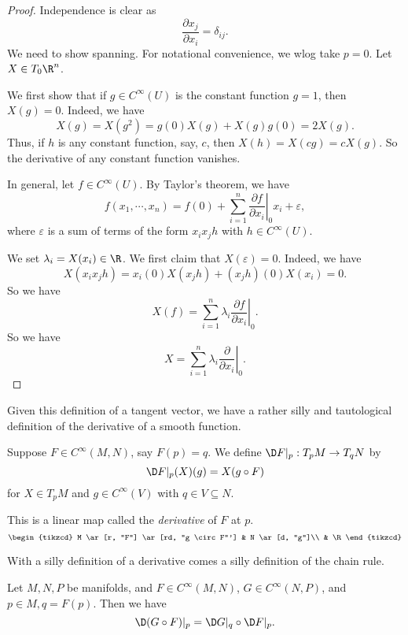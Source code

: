 \documentclass[a4paper]{article}
\begin{document}
\begin{proof}
  Independence is clear as
  \[
    \frac{\partial x_j}{\partial x_i} = \delta_{ij}.
  \]
  We need to show spanning. For notational convenience, we wlog take $p = 0$. Let $X \in T_0 \R^n$.

  We first show that if $g \in C^\infty(U)$ is the constant function $g = 1$, then $X(g) = 0$. Indeed, we have
  \[
    X(g) = X(g^2) = g(0) X(g) + X(g) g(0) = 2 X(g).
  \]
  Thus, if $h$ is any constant function, say, $c$, then $X(h) = X(cg) = c X(g)$. So the derivative of any constant function vanishes.

  In general, let $f \in C^\infty(U)$. By Taylor's theorem, we have
  \[
    f(x_1, \cdots, x_n) = f(0) + \sum_{i = 1}^n \left.\frac{\partial f}{\partial x_i}\right|_0 x_i + \varepsilon,
  \]
  where $\varepsilon$ is a sum of terms of the form $x_i x_j h$ with $h \in C^\infty(U)$.

  We set $\lambda_i = X(x_i) \in \R$. We first claim that $X(\varepsilon) = 0$. Indeed, we have
  \[
    X (x_i x_j h) = x_i(0) X(x_j h) + (x_jh)(0) X(x_i) = 0.
  \]
  So we have
  \[
    X(f) = \sum_{i = 1}^n \lambda_i \left.\frac{\partial f}{\partial x_i}\right|_0.
  \]
  So we have
  \[
    X = \sum_{i = 1}^n \lambda_i \left.\frac{\partial}{\partial x_i}\right|_0.
  \]
\end{proof}

Given this definition of a tangent vector, we have a rather silly and tautological definition of the derivative of a smooth function.
\begin{defi}[Derivative]
  Suppose $F \in C^\infty(M, N)$, say $F(p) = q$. We define $\D F|_p: T_p M \to T_q N$ by
  \[
    \D F|_p(X)(g) = X(g \circ F)
  \]
  for $X \in T_pM$ and $g \in C^\infty(V)$ with $q \in V \subseteq N$.

  This is a linear map called the \emph{derivative} of $F$ at $p$.
  \[
    \begin{tikzcd}
      M \ar[r, "F"] \ar[rd, "g \circ F"'] & N \ar[d, "g"]\\
      & \R
    \end{tikzcd}
  \]
\end{defi}

With a silly definition of a derivative comes a silly definition of the chain rule.
\begin{prop}
  Let $M, N, P$ be manifolds, and $F \in C^\infty(M, N)$, $G \in C^\infty(N, P)$, and $p \in M, q = F(p)$. Then we have
  \[
    \D(G \circ F)|_p = \D G|_q \circ \D F|_p.
  \]
\end{prop}
\end{document}
